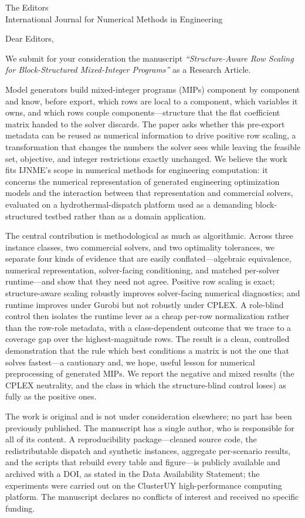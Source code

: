 \documentclass[11pt]{letter}
\begin{document}
\begin{letter}{The Editors\\International Journal for Numerical Methods in Engineering}

\opening{Dear Editors,}

We submit for your consideration the manuscript \emph{``Structure-Aware Row Scaling
for Block-Structured Mixed-Integer Programs''} as a Research Article.

Model generators build mixed-integer programs (MIPs) component by component and know,
before export, which rows are local to a component, which variables it owns, and which
rows couple components---structure that the flat coefficient matrix handed to the solver
discards. The paper asks whether this pre-export metadata can be reused as numerical
information to drive positive row scaling, a transformation that changes the numbers the
solver sees while leaving the feasible set, objective, and integer restrictions exactly
unchanged. We believe the work fits I{}JNME's scope in numerical methods for engineering
computation: it concerns the numerical representation of generated engineering
optimization models and the interaction between that representation and commercial
solvers, evaluated on a hydrothermal-dispatch platform used as a demanding
block-structured testbed rather than as a domain application.

The central contribution is methodological as much as algorithmic. Across three instance
classes, two commercial solvers, and two optimality tolerances, we separate four kinds of
evidence that are easily conflated---algebraic equivalence, numerical representation,
solver-facing conditioning, and matched per-solver runtime---and show that they need not
agree. Positive row scaling is exact; structure-aware scaling robustly improves
solver-facing numerical diagnostics; and runtime improves under Gurobi but not robustly
under CPLEX. A role-blind control then isolates the runtime lever as a cheap per-row
normalization rather than the row-role metadata, with a class-dependent outcome that we
trace to a coverage gap over the highest-magnitude rows. The result is a clean, controlled
demonstration that the rule which best conditions a matrix is not the one that solves
fastest---a cautionary and, we hope, useful lesson for numerical preprocessing of
generated MIPs. We report the negative and mixed results (the CPLEX neutrality, and the
class in which the structure-blind control loses) as fully as the positive ones.

The work is original and is not under consideration elsewhere; no part has been previously
published. The manuscript has a single author, who is responsible for all of its content.
A reproducibility package---cleaned source code, the redistributable dispatch and synthetic
instances, aggregate per-scenario results, and the scripts that rebuild every table and
figure---is publicly available and archived with a DOI, as stated in the Data Availability
Statement; the experiments were carried out on the ClusterUY high-performance computing
platform. The manuscript declares no conflicts of interest and received no specific
funding.


\end{letter}
\end{document}
